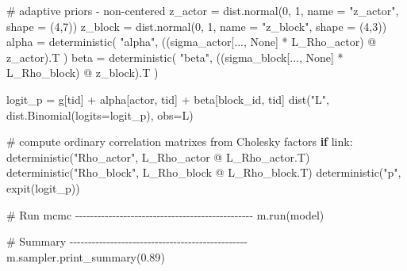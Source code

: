 \documentclass[
  letterpaper,
  DIV=11,
  numbers=noendperiod]{scrreprt}
\newenvironment{Shaded}{\begin{snugshade}}{\end{snugshade}}
\newcommand{\CommentTok}[1]{\textcolor[rgb]{0.37,0.37,0.37}{#1}}
\newcommand{\ControlFlowTok}[1]{\textcolor[rgb]{0.00,0.23,0.31}{\textbf{#1}}}
\newcommand{\DecValTok}[1]{\textcolor[rgb]{0.68,0.00,0.00}{#1}}
\newcommand{\FloatTok}[1]{\textcolor[rgb]{0.68,0.00,0.00}{#1}}
\newcommand{\NormalTok}[1]{\textcolor[rgb]{0.00,0.23,0.31}{#1}}
\newcommand{\OperatorTok}[1]{\textcolor[rgb]{0.37,0.37,0.37}{#1}}
\newcommand{\StringTok}[1]{\textcolor[rgb]{0.13,0.47,0.30}{#1}}
\newcommand{\VariableTok}[1]{\textcolor[rgb]{0.07,0.07,0.07}{#1}}
\begin{document}
\begin{tcolorbox}
\begin{Shaded}
\begin{Highlighting}[]
    \CommentTok{\# adaptive priors {-} non{-}centered}
\NormalTok{    z\_actor }\OperatorTok{=}\NormalTok{ dist.normal(}\DecValTok{0}\NormalTok{, }\DecValTok{1}\NormalTok{, name }\OperatorTok{=} \StringTok{"z\_actor"}\NormalTok{, shape }\OperatorTok{=}\NormalTok{ (}\DecValTok{4}\NormalTok{,}\DecValTok{7}\NormalTok{))}
\NormalTok{    z\_block }\OperatorTok{=}\NormalTok{ dist.normal(}\DecValTok{0}\NormalTok{, }\DecValTok{1}\NormalTok{, name }\OperatorTok{=} \StringTok{"z\_block"}\NormalTok{, shape }\OperatorTok{=}\NormalTok{ (}\DecValTok{4}\NormalTok{,}\DecValTok{3}\NormalTok{))}
\NormalTok{    alpha }\OperatorTok{=}\NormalTok{ deterministic(}
        \StringTok{"alpha"}\NormalTok{, ((sigma\_actor[..., }\VariableTok{None}\NormalTok{] }\OperatorTok{*}\NormalTok{ L\_Rho\_actor) }\OperatorTok{@}\NormalTok{ z\_actor).T}
\NormalTok{    )}
\NormalTok{    beta }\OperatorTok{=}\NormalTok{ deterministic(}
        \StringTok{"beta"}\NormalTok{, ((sigma\_block[..., }\VariableTok{None}\NormalTok{] }\OperatorTok{*}\NormalTok{ L\_Rho\_block) }\OperatorTok{@}\NormalTok{ z\_block).T}
\NormalTok{    )}

\NormalTok{    logit\_p }\OperatorTok{=}\NormalTok{ g[tid] }\OperatorTok{+}\NormalTok{ alpha[actor, tid] }\OperatorTok{+}\NormalTok{ beta[block\_id, tid]}
\NormalTok{    dist(}\StringTok{"L"}\NormalTok{, dist.Binomial(logits}\OperatorTok{=}\NormalTok{logit\_p), obs}\OperatorTok{=}\NormalTok{L)}

    \CommentTok{\# compute ordinary correlation matrixes from Cholesky factors}
    \ControlFlowTok{if}\NormalTok{ link:}
\NormalTok{        deterministic(}\StringTok{"Rho\_actor"}\NormalTok{, L\_Rho\_actor }\OperatorTok{@}\NormalTok{ L\_Rho\_actor.T)}
\NormalTok{        deterministic(}\StringTok{"Rho\_block"}\NormalTok{, L\_Rho\_block }\OperatorTok{@}\NormalTok{ L\_Rho\_block.T)}
\NormalTok{        deterministic(}\StringTok{"p"}\NormalTok{, expit(logit\_p))}

\CommentTok{\# Run mcmc {-}{-}{-}{-}{-}{-}{-}{-}{-}{-}{-}{-}{-}{-}{-}{-}{-}{-}{-}{-}{-}{-}{-}{-}{-}{-}{-}{-}{-}{-}{-}{-}{-}{-}{-}{-}{-}{-}{-}{-}{-}{-}{-}{-}{-}{-}{-}{-}}
\NormalTok{m.run(model) }

\CommentTok{\# Summary {-}{-}{-}{-}{-}{-}{-}{-}{-}{-}{-}{-}{-}{-}{-}{-}{-}{-}{-}{-}{-}{-}{-}{-}{-}{-}{-}{-}{-}{-}{-}{-}{-}{-}{-}{-}{-}{-}{-}{-}{-}{-}{-}{-}{-}{-}{-}{-}}
\NormalTok{m.sampler.print\_summary(}\FloatTok{0.89}\NormalTok{)}
\end{Highlighting}
\end{Shaded}

\end{tcolorbox}
\end{document}

